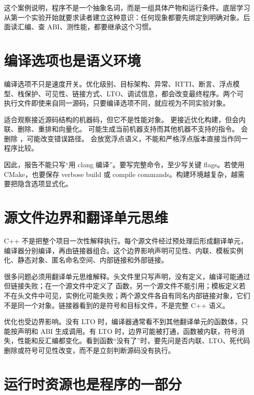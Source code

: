 这个案例说明，程序不是一个抽象名词，而是一组具体产物和运行条件。底层学习从第一个实验开始就要求读者建立这种意识：任何现象都要先绑定到明确对象。后面读汇编、查 ABI、测性能，都要继承这个习惯。

\section{编译选项也是语义环境}

编译选项不只是速度开关。优化级别、目标架构、异常、RTTI、断言、浮点模型、栈保护、可见性、链接方式、LTO、调试信息，都会改变最终程序。两个可执行文件即使来自同一源码，只要编译选项不同，就应视为不同实验对象。

 适合观察接近源码结构的机器码，但它不是性能对象。 更接近优化构建，但会内联、删除、重排和向量化。 可能生成当前机器支持而其他机器不支持的指令。 会删除 ，可能改变错误路径。 会放宽浮点语义，不能和严格浮点版本直接当作同一程序比较。

因此，报告不能只写“用 clang 编译”。要写完整命令，至少写关键 flags。若使用 CMake，也要保存 verbose build 或 compile commands。构建环境越复杂，越需要把隐含选项显式化。

\section{源文件边界和翻译单元思维}

C++ 不是把整个项目一次性解释执行。每个源文件经过预处理后形成翻译单元，编译器分别编译，再由链接器组合。这个边界影响声明可见性、内联、模板实例化、静态对象、匿名命名空间、内部链接和外部链接。

很多问题必须用翻译单元思维解释。头文件里只写声明，没有定义，编译可能通过但链接失败；在一个源文件中定义了  函数，另一个源文件不能引用；模板定义若不在头文件中可见，实例化可能失败；两个源文件各自有同名内部链接对象，它们不是同一个对象。链接器看到的是符号和目标文件，不是完整 C++ 语义。

优化也受边界影响。没有 LTO 时，编译器通常看不到其他翻译单元的函数体，只能按声明和 ABI 生成调用。有 LTO 时，边界可能被打通，函数被内联，符号消失，性能和反汇编都变化。看到函数“没有了”时，要先问是否内联、LTO、死代码删除或符号可见性改变，而不是立刻判断源码没有执行。

\section{运行时资源也是程序的一部分}


